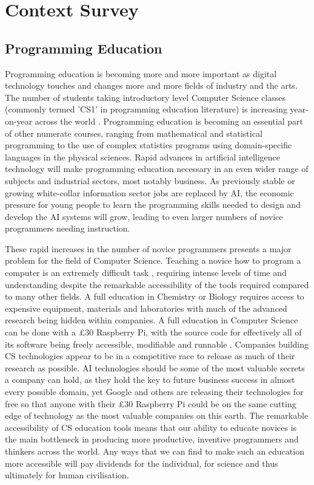 \chapter{Context Survey}

\section{Programming Education}

Programming education is becoming more and more important as digital technology touches and changes more and more fields of industry and the arts. The number of students taking introductory level Computer Science classes (commonly termed 'CS1' in programming education literature\cite{Hertz:2010:CCM:1734263.1734335}) is increasing year-on-year across the world \cite{nager2016case}. Programming education is becoming an essential part of other numerate courses, ranging from mathematical and statistical programming to the use of complex statistics programs using domain-specific languages in the physical sciences. Rapid advances in artificial intelligence technology will make programming education necessary in an even wider range of subjects and industrial sectors, most notably business. As previously stable or growing white-collar information sector jobs are replaced by AI, the economic pressure for young people to learn the programming skills needed to design and develop the AI systems will grow, leading to even larger numbers of novice programmers needing instruction.

These rapid increases in the number of novice programmers presents a major problem for the field of Computer Science. Teaching a novice how to program a computer is an extremely difficult task \cite{Bonar:1983:UPN:567067.567069}, requiring intense levels of time and understanding despite the remarkable accessibility of the tools required compared to many other fields. A full education in Chemistry or Biology requires access to expensive equipment, materials and laboratories with much of the advanced research being hidden within companies. A full education in Computer Science can be done with a \pounds 30 Raspberry Pi, with the source code for effectively all of its software being freely accessible, modifiable and runnable \cite{6495436}. Companies building CS technologies appear to be in a competitive race to release as much of their research as possible. AI technologies should be some of the most valuable secrets a company can hold, as they hold the key to future business success in almost every possible domain, yet Google and others are releasing their technologies for free so that anyone with their \pounds 30 Raspberry Pi could be on the same cutting edge of technology as the most valuable companies on this earth. The remarkable accessibility of CS education tools means that our ability to educate novices is the main bottleneck in producing more productive, inventive programmers and thinkers across the world. Any ways that we can find to make such an education more accessible will pay dividends for the individual, for science and thus ultimately for human civilisation.

